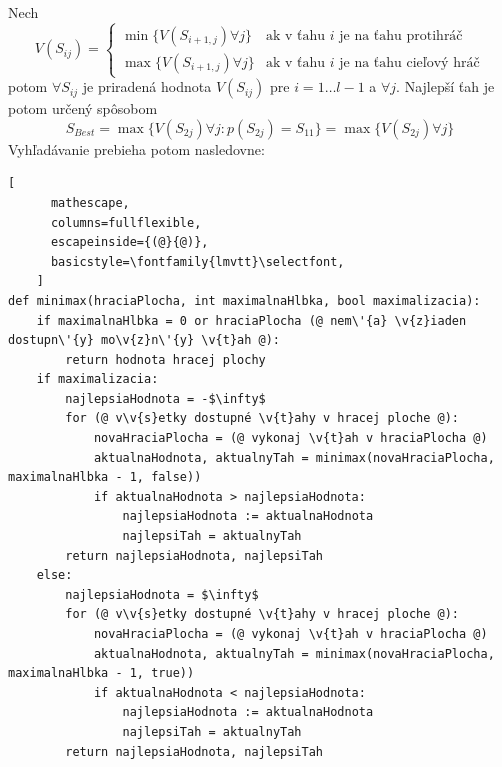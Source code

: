 Nech
\begin{equation}
    V(S_{ij}) =
    \begin{cases}
        \min{\{V(S_{i+1,j}) \forall j\}} & \text{ak v ťahu } i \text{ je na ťahu protihráč} \\
        \max{\{V(S_{i+1,j}) \forall j\}} & \text{ak v ťahu } i \text{ je na ťahu cieľový hráč}
    \end{cases}
\end{equation}
potom $\forall S_{ij}$ je priradená hodnota $V(S_{ij})$ pre $i = 1 \dots l-1$ a $\forall j$.
Najlepší ťah je potom určený spôsobom
\begin{equation}
    S_{Best} = \max{\{V(S_{2j}) \forall j \colon p(S_{2j}) = S_{11}\}} = \max{\{V(S_{2j}) \forall j\}}
\end{equation}
Vyhľadávanie prebieha potom nasledovne:\cite{algo_minimax_pseudocode}
\begin{tiny}
    \begin{lstlisting}[
      mathescape,
      columns=fullflexible,
      escapeinside={(@}{@)},
      basicstyle=\fontfamily{lmvtt}\selectfont,
    ]
def minimax(hraciaPlocha, int maximalnaHlbka, bool maximalizacia):
    if maximalnaHlbka = 0 or hraciaPlocha (@ nem\'{a} \v{z}iaden dostupn\'{y} mo\v{z}n\'{y} \v{t}ah @):
        return hodnota hracej plochy
    if maximalizacia:
        najlepsiaHodnota = -$\infty$
        for (@ v\v{s}etky dostupné \v{t}ahy v hracej ploche @):
            novaHraciaPlocha = (@ vykonaj \v{t}ah v hraciaPlocha @)
            aktualnaHodnota, aktualnyTah = minimax(novaHraciaPlocha, maximalnaHlbka - 1, false))
            if aktualnaHodnota > najlepsiaHodnota:
                najlepsiaHodnota := aktualnaHodnota
                najlepsiTah = aktualnyTah
        return najlepsiaHodnota, najlepsiTah
    else:
        najlepsiaHodnota = $\infty$
        for (@ v\v{s}etky dostupné \v{t}ahy v hracej ploche @):
            novaHraciaPlocha = (@ vykonaj \v{t}ah v hraciaPlocha @)
            aktualnaHodnota, aktualnyTah = minimax(novaHraciaPlocha, maximalnaHlbka - 1, true))
            if aktualnaHodnota < najlepsiaHodnota:
                najlepsiaHodnota := aktualnaHodnota
                najlepsiTah = aktualnyTah
        return najlepsiaHodnota, najlepsiTah
\end{lstlisting}
\end{tiny}

